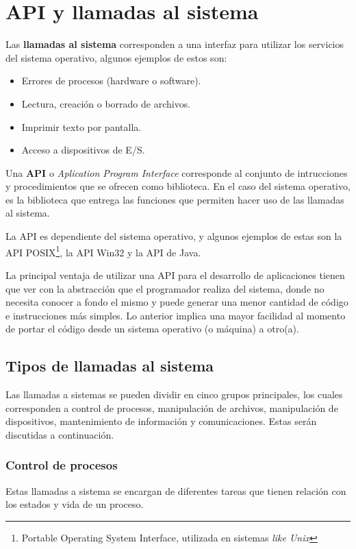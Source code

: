 \section{API y llamadas al sistema}
Las \textbf{llamadas al sistema} corresponden a una interfaz para utilizar los
servicios del sistema operativo, algunos ejemplos de estos son:

\begin{itemize}

	\item Errores de procesos (hardware o software).

	\item Lectura, creación o borrado de archivos.

	\item Imprimir texto por pantalla.

	\item Acceso a dispositivos de E/S.

\end{itemize}

Una \textbf{API} o \textit{Aplication Program Interface} corresponde al conjunto
de intrucciones y procedimientos que se ofrecen como biblioteca. En el caso del
sistema operativo, es la biblioteca que entrega las funciones que permiten hacer
uso de las llamadas al sistema.

La API es dependiente del sistema operativo, y algunos ejemplos de estas son la
API POSIX\footnote{Portable Operating System Interface, utilizada en sistemas
\textit{like Unix}}, la API Win32 y la API de Java.

La principal ventaja de utilizar una API para el desarrollo de aplicaciones
tienen que ver con la abstracción que el programador realiza del sistema, donde
no necesita conocer a fondo el mismo y puede generar una menor cantidad de
código e instrucciones más simples. Lo anterior implica una mayor facilidad al
momento de portar el código desde un sistema operativo (o máquina) a otro(a).

\subsection{Tipos de llamadas al sistema}
Las llamadas a sistemas se pueden dividir en cinco grupos principales, los
cuales corresponden a control de procesos, manipulación de archivos,
manipulación de dispositivos, mantenimiento de información y comunicaciones.
Estas serán discutidas a continuación.

\subsubsection{Control de procesos}
Estas llamadas a sistema se encargan de diferentes tareas que tienen relación
con los estados y vida de un proceso.

